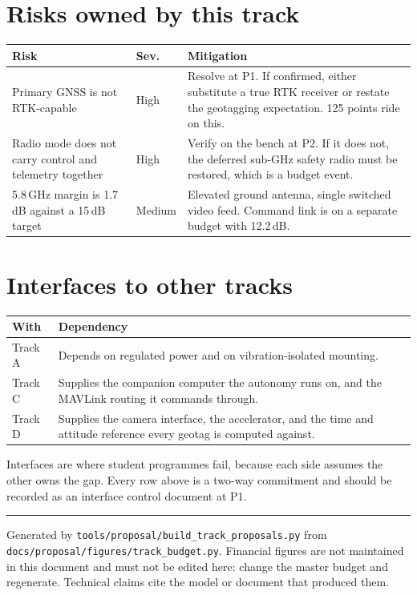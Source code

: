 \documentclass[11pt,a4paper]{article}
\begin{document}
\section{Risks owned by this track}

\begin{center}
\begin{tabular}{@{}p{50mm}lp{70mm}@{}}
\toprule
\textbf{Risk} & \textbf{Sev.} & \textbf{Mitigation} \\
\midrule
Primary GNSS is not RTK-capable & High & Resolve at P1. If confirmed, either substitute a true RTK receiver or restate the geotagging expectation. 125 points ride on this. \\
Radio mode does not carry control and telemetry together & High & Verify on the bench at P2. If it does not, the deferred sub-GHz safety radio must be restored, which is a budget event. \\
5.8\,GHz margin is 1.7\,dB against a 15\,dB target & Medium & Elevated ground antenna, single switched video feed. Command link is on a separate budget with 12.2\,dB. \\
\bottomrule
\end{tabular}
\end{center}

\section{Interfaces to other tracks}

\begin{center}
\begin{tabular}{@{}lp{110mm}@{}}
\toprule
\textbf{With} & \textbf{Dependency} \\
\midrule
Track A & Depends on regulated power and on vibration-isolated mounting. \\
Track C & Supplies the companion computer the autonomy runs on, and the MAVLink routing it commands through. \\
Track D & Supplies the camera interface, the accelerator, and the time and attitude reference every geotag is computed against. \\
\bottomrule
\end{tabular}
\end{center}

Interfaces are where student programmes fail, because each side assumes the
other owns the gap. Every row above is a two-way commitment and should be
recorded as an interface control document at P1.


\vfill
\hrule\vspace{2mm}
{\small Generated by \texttt{tools/proposal/build\_track\_proposals.py} from
\texttt{docs/proposal/figures/track\_budget.py}. Financial figures are not
maintained in this document and must not be edited here: change the master
budget and regenerate. Technical claims cite the model or document that
produced them.}
\end{document}
